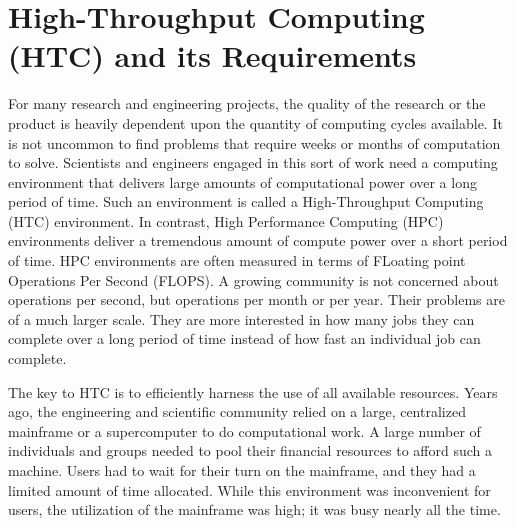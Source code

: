 \section{\label{sec:overview}High-Throughput Computing (HTC) and its Requirements}

For many research and engineering projects, the quality of the research
or the product is heavily dependent upon the quantity of computing
cycles available.
It is not uncommon to find problems that require weeks
or months of computation to solve.
Scientists and engineers engaged in
this sort of work need a computing environment that delivers large
amounts of computational power over a long period of time.
Such an environment is called a High-Throughput Computing (HTC) environment.
In contrast, High Performance Computing (HPC)
environments deliver a
tremendous amount of compute power over a short period of time.
HPC environments are often measured in terms of FLoating point Operations
Per Second (FLOPS). 
A growing community is not concerned about operations per second,
but operations per month or per year.
Their problems are of a much larger scale.
They are
more interested in how many jobs they can complete over a long period of
time instead of how fast an individual job can complete.

The key to HTC is to efficiently harness the use of all available
resources. Years ago, the engineering and scientific community relied on
a large, centralized mainframe or a supercomputer to do
computational work. 
A large number of individuals and groups needed
to pool their financial resources to afford such a machine.
Users had to wait for their turn on the mainframe, 
and they had a limited amount of time allocated.
While this environment was inconvenient for users,
the utilization of the mainframe was high;
it was busy nearly all the time.

